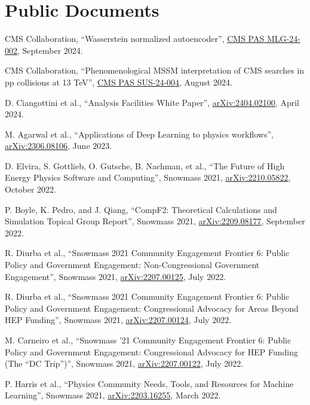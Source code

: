\section{Public Documents}
\begin{description}[leftmargin=12pt,font=\normalfont,labelsep=0em]
\item CMS Collaboration, ``Wasserstein normalized autoencoder'', \href{http://cds.cern.ch/record/2911111}{CMS PAS MLG-24-002}, September 2024. %
\item CMS Collaboration, ``Phenomenological MSSM interpretation of CMS searches in pp collisions at 13 TeV'', \href{http://cds.cern.ch/record/2906621}{CMS PAS SUS-24-004}, August 2024. %
\item D. Ciangottini et al., ``Analysis Facilities White Paper'', \href{https://arxiv.org/abs/2404.02100}{arXiv:2404.02100}, April 2024. %
\item M. Agarwal et al., ``Applications of Deep Learning to physics workflows'', \href{https://arxiv.org/abs/2306.08106}{arXiv:2306.08106}, June 2023. %
\item D. Elvira, S. Gottlieb, O. Gutsche, B. Nachman, et al., ``The Future of High Energy Physics Software and Computing'', Snowmass 2021, \href{https://arxiv.org/abs/2210.05822}{arXiv:2210.05822}, October 2022. %
\item P. Boyle, K. Pedro, and J. Qiang, ``CompF2: Theoretical Calculations and Simulation Topical Group Report'', Snowmass 2021, \href{https://arxiv.org/abs/2209.08177}{arXiv:2209.08177}, September 2022. %
\item R. Diurba et al., ``Snowmass 2021 Community Engagement Frontier 6: Public Policy and Government Engagement: Non-Congressional Government Engagement'', Snowmass 2021, \href{https://arxiv.org/abs/2207.00125}{arXiv:2207.00125}, July 2022. %
\item R. Diurba et al., ``Snowmass 2021 Community Engagement Frontier 6: Public Policy and Government Engagement: Congressional Advocacy for Areas Beyond HEP Funding'', Snowmass 2021, \href{https://arxiv.org/abs/2207.00124}{arXiv:2207.00124}, July 2022. %
\item M. Carneiro et al., ``Snowmass '21 Community Engagement Frontier 6: Public Policy and Government Engagement: Congressional Advocacy for HEP Funding (The ``DC Trip'')'', Snowmass 2021, \href{https://arxiv.org/abs/2207.00122}{arXiv:2207.00122}, July 2022. %
\item P. Harris et al., ``Physics Community Needs, Tools, and Resources for Machine Learning'', Snowmass 2021, \href{https://arxiv.org/abs/2203.16255}{arXiv:2203.16255}, March 2022. %

\end{description}

